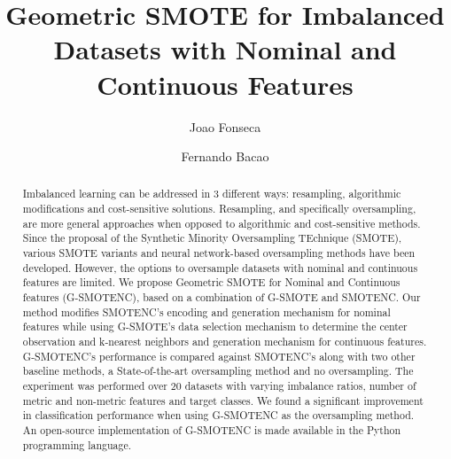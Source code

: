 \documentclass[preprint,12pt]{elsarticle}
\begin{document}
{\setlength{\tabcolsep}{2.5pt}

\begin{frontmatter}

\title{Geometric SMOTE for Imbalanced Datasets with Nominal and Continuous Features}

\author[inst1]{Joao Fonseca}
\author[inst1]{Fernando Bacao}


\begin{abstract}

    Imbalanced learning can be addressed in 3 different ways: resampling,
    algorithmic modifications and cost-sensitive solutions. Resampling, and
    specifically oversampling, are more general approaches when opposed to
    algorithmic and cost-sensitive methods. Since the proposal of the
    Synthetic Minority Oversampling TEchnique (SMOTE), various SMOTE variants
    and neural network-based oversampling methods have been developed.
    However, the options to oversample datasets with nominal and continuous
    features are limited. We propose Geometric SMOTE for Nominal and
    Continuous features (G-SMOTENC), based on a combination of G-SMOTE and
    SMOTENC. Our method modifies SMOTENC's encoding and generation mechanism
    for nominal features while using G-SMOTE's data selection mechanism to
    determine the center observation and k-nearest neighbors and generation
    mechanism for continuous features. G-SMOTENC's performance is compared
    against SMOTENC's along with two other baseline methods, a
    State-of-the-art oversampling method and no oversampling. The experiment
    was performed over 20 datasets with varying imbalance ratios, number of
    metric and non-metric features and target classes. We found a significant
    improvement in classification performance when using G-SMOTENC as
    the oversampling method. An open-source implementation of G-SMOTENC is
    made available in the Python programming language.

\end{abstract}



\end{frontmatter}}
\end{document}

